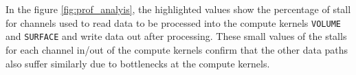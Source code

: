 In the figure \ref{fig:prof_analyis},
the highlighted values show the percentage of stall for channels used to
read data to be processed into the compute kernels \texttt{VOLUME} and \texttt{SURFACE}
and write data out after processing. These small values of the stalls for
each channel in/out of the compute kernels confirm that the other data paths
also suffer similarly due to bottlenecks at the compute kernels.


